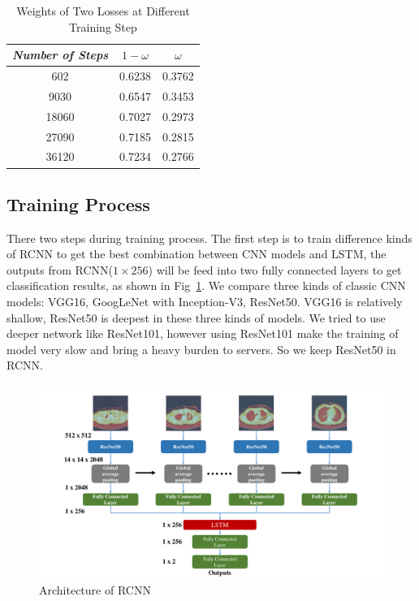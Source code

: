 \documentclass[journal]{IEEEtran}
\begin{document}
\begin{table}[t]
    \vspace{-0cm}
    \caption{Weights of Two Losses at Different Training Step}
    \vspace{-0cm}
    \begin{center}
    \begin{tabular}{|c|c|c|}
    \hline
    \textbf{\textit{Number of Steps}} & \textbf{\textit{$1 - \omega$}} & \textbf{\textit{$\omega$}}\\
    \hline
    602 &0.6238 & 0.3762  \\
    9030 &0.6547 & 0.3453  \\
    18060 &0.7027 & 0.2973  \\
    27090 &0.7185 & 0.2815  \\
    36120 &0.7234 & 0.2766  \\

    \hline
    \end{tabular}
    \vspace{-0cm}
    \label{weights}
    \end{center}
    \vspace{-0cm}
    \end{table}

\subsection{Training Process}
\label{trainingprocess}
There two steps during training process.
The first step is to train difference kinds of RCNN to get the best combination between CNN models and LSTM, the outputs from RCNN($1 \times 256$) will be feed into two fully connected layers to get classification results, as shown in Fig~\ref{onestream}. We compare three kinds of classic CNN models: VGG16, GoogLeNet with Inception-V3, ResNet50. VGG16 is relatively shallow, ResNet50 is deepest in these three kinds of models. We tried to use deeper network like ResNet101, however using ResNet101 make the training of model very slow and bring a heavy burden to servers. So we keep ResNet50 in RCNN.
\begin{figure}[t]
    \centerline{\includegraphics[width=150mm]{onestream.pdf}}
    \vspace{-0cm}
    \caption{Architecture of RCNN}
    \vspace{-0cm}
    \label{onestream}
    \end{figure}
\end{document}
